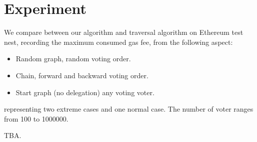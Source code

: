 \section{Experiment}
We compare between our algorithm and traversal algorithm on Ethereum test nest, recording the maximum consumed gas fee, from the following aspect:

\begin{itemize}
	\item Random graph, random voting order.
	\item Chain, forward and backward voting order.
	\item Start graph (no delegation) any voting voter. 
\end{itemize}
representing two extreme cases and one normal case. The number of voter ranges from 100 to 1000000.

TBA.